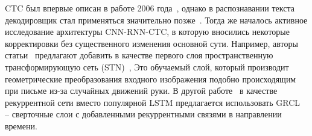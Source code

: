 {    CTC был впервые описан в работе 2006 года~\cite{graves2006connectionist}, однако в распознавании текста декодировщик
    стал применяться значительно позже~\cite{bluche2014comparison, bluche2017gated, puigcerver2017multidimensional}.
    Тогда же началось активное исследование архитектуры CNN-RNN-CTC, в которую вносились некоторые корректировки без существенного изменения основной сути.
    Например, авторы статьи~\cite{dutta2018improving} предлагают добавить в качестве первого слоя пространственную трансформирующую сеть (STN)~\cite{jaderberg2015spatial},
    Это обучаемый слой, который производит геометрические преобразования входного изображения подобно происходящим при письме из-за случайных движений руки.
    В другой работе~\cite{ingle2019scalable} в качестве рекуррентной сети вместо популярной LSTM предлагается использовать GRCL~\cite{wang2017gated} --
    сверточные слои с добавленными рекуррентными связями в направлении времени.
}


